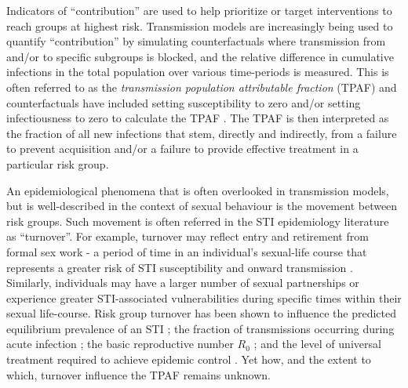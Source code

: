 \par %
Indicators of ``contribution'' are used to help prioritize or target interventions
to reach groups at highest risk. %
Transmission models are increasingly being used to quantify
``contribution'' by simulating counterfactuals where transmission 
from and/or to specific subgroups is blocked, and 
the relative difference in cumulative infections in the total population over 
various time-periods is measured. %
This is often referred to as the \textit{transmission population attributable fraction} (TPAF) 
and counterfactuals have included
setting susceptibility to zero and/or setting 
infectiousness to zero to calculate the TPAF \citep{Mishra2012}.
The TPAF is then interpreted as
the fraction of all new infections that stem,
directly and indirectly, from a failure to prevent acquisition and/or 
a failure to provide effective treatment in a particular risk group.		%
\par
An epidemiological phenomena that is often overlooked in transmission models, but
is well-described in the context of sexual behaviour 
is the movement between risk groups.						%
Such movement 
is often referred in the STI epidemiology literature as ``turnover''.  %
For example, turnover may reflect entry and retirement from	%
formal sex work - a period of time in an individual's sexual-life course
that represents a greater risk of STI susceptibility and 
onward transmission \citep{Watts2010}. Similarly, individuals 
may have a larger number of sexual partnerships or experience
greater STI-associated vulnerabilities during specific times
within their sexual life-course. %
Risk group turnover has been shown to 
influence the predicted equilibrium prevalence of an STI \citep{Stigum1994,Eaton2014};
the fraction of transmissions occurring during acute infection \citep{Zhang2012};		%
the basic reproductive number $R_0$ \citep{Henry2015}; and						%
the level of universal treatment required to achieve epidemic control \citep{Henry2015}.	%
Yet how, and the extent to which, turnover influence the TPAF remains unknown.

